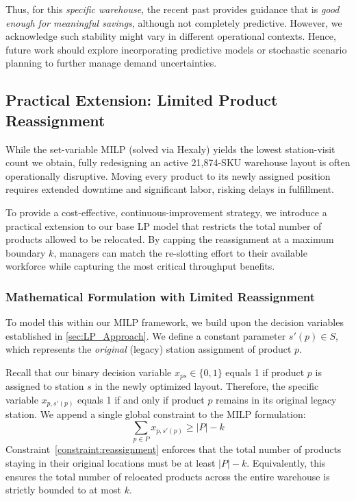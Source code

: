 \documentclass[preprint,review,11pt,authoryear]{elsarticle}
\begin{document}
Thus, for this \textit{specific warehouse}, the recent past provides guidance that is \emph{good enough for meaningful savings}, although not completely predictive. However, we acknowledge such stability might vary in different operational contexts. Hence, future work should explore incorporating predictive models or stochastic scenario planning to further manage demand uncertainties.

\subsection{Practical Extension: Limited Product Reassignment}
\label{sec:limited_reassignment}

While the set-variable MILP (solved via Hexaly) yields the lowest station-visit count we obtain, fully redesigning an active 21,874-SKU warehouse layout is often operationally disruptive. Moving every product to its newly assigned position requires extended downtime and significant labor, risking delays in fulfillment.

To provide a cost-effective, continuous-improvement strategy, we introduce a practical extension to our base LP model that restricts the total number of products allowed to be relocated. By capping the reassignment at a maximum boundary $k$, managers can match the re-slotting effort to their available workforce while capturing the most critical throughput benefits.

\subsubsection{Mathematical Formulation with Limited Reassignment}
To model this within our MILP framework, we build upon the decision variables established in \cref{sec:LP_Approach}. We define a constant parameter $s'(p) \in S$, which represents the \emph{original} (legacy) station assignment of product $p$.

Recall that our binary decision variable $x_{ps} \in \{0,1\}$ equals 1 if product $p$ is assigned to station $s$ in the newly optimized layout. Therefore, the specific variable $x_{p, s'(p)}$ equals 1 if and only if product $p$ remains in its original legacy station. We append a single global constraint to the MILP formulation:
\begin{equation}
\sum_{p \in P} x_{p,s'(p)} \ge |P| - k
\label{constraint:reassignment}
\end{equation}
Constraint~\eqref{constraint:reassignment} enforces that the total number of products staying in their original locations must be at least $|P| - k$. Equivalently, this ensures the total number of relocated products across the entire warehouse is strictly bounded to at most $k$.
\end{document}
